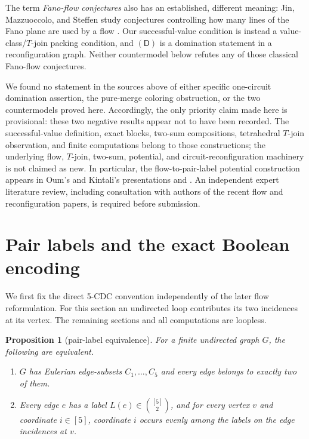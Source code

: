 \documentclass[11pt]{article}
\newtheorem{proposition}[theorem]{Proposition}
\theoremstyle{definition}
\theoremstyle{remark}
\begin{document}
The term \emph{Fano-flow conjectures} also has an established, different
meaning: Jin, Mazzuoccolo, and Steffen study conjectures controlling how
many lines of the Fano plane are used by a flow
\cite{jin2018}.  Our successful-value condition is instead a
value-class/\(T\)-join packing condition, and \((\mathsf D)\) is a
domination statement in a reconfiguration graph.  Neither countermodel
below refutes any of those classical Fano-flow conjectures.

We found no statement in the sources above of either specific
one-circuit domination assertion, the pure-merge coloring obstruction,
or the two countermodels proved here.  Accordingly, the only priority
claim made here is provisional: these two negative results appear not to
have been recorded.  The successful-value definition, exact blocks,
two-sum compositions, tetrahedral \(T\)-join observation, and finite
computations belong to those constructions; the underlying flow,
\(T\)-join, two-sum, potential, and circuit-reconfiguration machinery is
not claimed as new.  In particular, the flow-to-pair-label potential
construction appears in Oum's and Kintali's presentations
\cite[Section~5]{oum2026} and \cite{kintali2026}.  An independent expert literature
review, including consultation with authors of the recent flow and
reconfiguration papers, is required before submission.

\section{Pair labels and the exact Boolean encoding}
\label{sec:labels}

We first fix the direct 5-CDC convention independently of the later flow
reformulation.  For this section an undirected loop contributes its two
incidences at its vertex.  The remaining sections and all computations
are loopless.

\begin{proposition}[pair-label equivalence]\label{prop:labels}
For a finite undirected graph \(G\), the following are equivalent.
\begin{enumerate}
  \item \(G\) has Eulerian edge-subsets \(C_1,\ldots,C_5\) and every edge
        belongs to exactly two of them.
  \item Every edge \(e\) has a label
        \(L(e)\in\binom{[5]}2\), and for every vertex \(v\) and
        coordinate \(i\in[5]\), coordinate \(i\) occurs evenly among the
        labels on the edge incidences at \(v\).
\end{enumerate}
\end{proposition}
\end{document}
